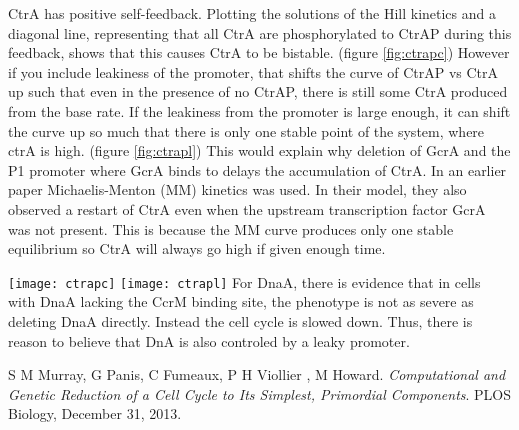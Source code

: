 \documentclass{article}
\begin{document}
CtrA has positive self-feedback.  Plotting the solutions of the Hill kinetics and a diagonal line, representing that all CtrA are phosphorylated to CtrAP during this feedback, shows that this causes CtrA to be bistable. (figure \ref{fig:ctrapc})  However if you include leakiness of the promoter, that shifts the curve of CtrAP vs CtrA up such that even in the presence of no CtrAP, there is still some CtrA produced from the base rate.  If the leakiness from the promoter is large enough, it can shift the curve up so much that there is only one stable point of the system, where ctrA is high. (figure \ref{fig:ctrapl}) This would explain why deletion of GcrA and the P1 promoter where GcrA binds to delays the accumulation of CtrA.  In an earlier paper \cite{compgenre} Michaelis-Menton (MM) kinetics was used.  In their model, they also observed a restart of CtrA even when the upstream transcription factor GcrA was not present.  This is because the MM curve produces only one stable equilibrium so CtrA will always go high if given enough time.

\texttt{[image: ctrapc]}
\texttt{[image: ctrapl]}
\newline \newline
For DnaA, there is evidence that in cells with DnaA lacking the CcrM binding site, the phenotype is not as severe as deleting DnaA directly.  Instead the cell cycle is slowed down.  Thus, there is reason to believe that DnA is also controled by a leaky promoter.  

\begin{thebibliography}{9}
S M Murray, G Panis, C Fumeaux, P H Viollier , M Howard. 
\textit{Computational and Genetic Reduction of a Cell Cycle to Its Simplest, Primordial Components}. 
PLOS Biology, December 31, 2013.
 
\end{thebibliography}
	
\end{document}
